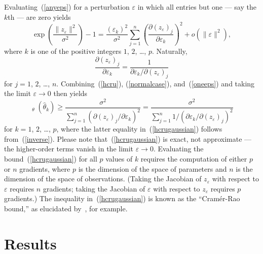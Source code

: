 \documentclass[]{fairmeta}
\DeclareMathOperator{\var}{\mathop{}{Var}}
\renewcommand{\epsilon}{\varepsilon}
\begin{document}
Evaluating~(\ref{anyeps}) for a perturbation $\epsilon$ in which all entries
but one --- say the $k$th --- are zero yields
%
\begin{equation}
\label{oneeps}
\exp\left( \frac{\|z_{\epsilon}\|^2}{\sigma^2} \right) - 1
= \frac{(\epsilon_k)^2}{\sigma^2} \sum_{j=1}^n
  \left( \frac{\partial (z_{\epsilon})_j}{\partial \epsilon_k} \right)^2
  + o(\|\epsilon\|^2),
\end{equation}
%
where $k$ is one of the positive integers $1$, $2$, \dots, $p$. Naturally,
%
\begin{equation}
\label{inverse}
\frac{\partial (z_{\epsilon})_j}{\partial \epsilon_k}
= \frac{1}{\partial \epsilon_k/\partial (z_{\epsilon})_j}
\end{equation}
%
for $j = 1$, $2$, \dots, $n$.
Combining~(\ref{hcru}), (\ref{normalcase}), and~(\ref{oneeps})
and taking the limit $\epsilon \to 0$ then yields
%
\begin{equation}
\label{hcrugaussian}
\var_{\theta}(\hat\theta_k)
\ge \frac{\sigma^2}
         {\sum_{j=1}^n (\partial (z_{\epsilon})_j/\partial \epsilon_k)^2}
= \frac{\sigma^2}
       {\sum_{j=1}^n 1/(\partial \epsilon_k/\partial (z_{\epsilon})_j)^2}
\end{equation}
%
for $k = 1$, $2$, \dots, $p$,
where the latter equality in~(\ref{hcrugaussian}) follows from~(\ref{inverse}).
Please note that~(\ref{hcrugaussian}) is exact, not approximate ---
the higher-order terms vanish in the limit $\epsilon \to 0$.
Evaluating the bound~(\ref{hcrugaussian}) for all $p$ values of $k$
requires the computation of either $p$ or $n$ gradients,
where $p$ is the dimension of the space of parameters
and $n$ is the dimension of the space of observations.
(Taking the Jacobian of $z_{\epsilon}$ with respect to $\epsilon$
requires $n$ gradients; taking the Jacobian of $\epsilon$
with respect to $z_{\epsilon}$ requires $p$ gradients.)
The inequality in~(\ref{hcrugaussian}) is known as the ``Cram\'er-Rao bound,''
as elucidated by~\cite{hannun-guo-van-der-maaten}, for example.



\section{Results}
\label{results}
\end{document}
